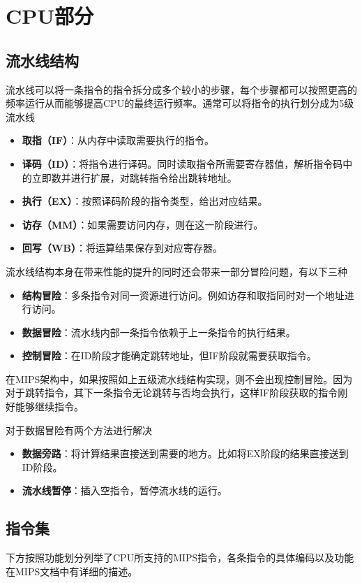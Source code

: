 \chapter{CPU部分}

\section{流水线结构}
流水线可以将一条指令的指令拆分成多个较小的步骤，每个步骤都可以按照更高的频率运行从而能够提高CPU的最终运行频率。通常可以将指令的执行划分成为5级流水线
\begin{itemize}
	\item \textbf{取指（IF）}：从内存中读取需要执行的指令。
	\item \textbf{译码（ID）}：将指令进行译码。同时读取指令所需要寄存器值，解析指令码中的立即数并进行扩展，对跳转指令给出跳转地址。
	\item \textbf{执行（EX）}：按照译码阶段的指令类型，给出对应结果。
	\item \textbf{访存（MM）}：如果需要访问内存，则在这一阶段进行。
	\item \textbf{回写（WB）}：将运算结果保存到对应寄存器。
\end{itemize}

流水线结构本身在带来性能的提升的同时还会带来一部分冒险问题，有以下三种
\begin{itemize}
	\item \textbf{结构冒险}：多条指令对同一资源进行访问。例如访存和取指同时对一个地址进行访问。
	\item \textbf{数据冒险}：流水线内部一条指令依赖于上一条指令的执行结果。
	\item \textbf{控制冒险}：在ID阶段才能确定跳转地址，但IF阶段就需要获取指令。
\end{itemize}

在MIPS架构中，如果按照如上五级流水线结构实现，则不会出现控制冒险。因为对于跳转指令，其下一条指令无论跳转与否均会执行，这样IF阶段获取的指令刚好能够继续指令。

对于数据冒险有两个方法进行解决

\begin{itemize}
	\item \textbf{数据旁路}：将计算结果直接送到需要的地方。比如将EX阶段的结果直接送到ID阶段。
	\item \textbf{流水线暂停}：插入空指令，暂停流水线的运行。
\end{itemize}

\section{指令集}
下方按照功能划分列举了CPU所支持的MIPS指令，各条指令的具体编码以及功能在MIPS文档中有详细的描述。
